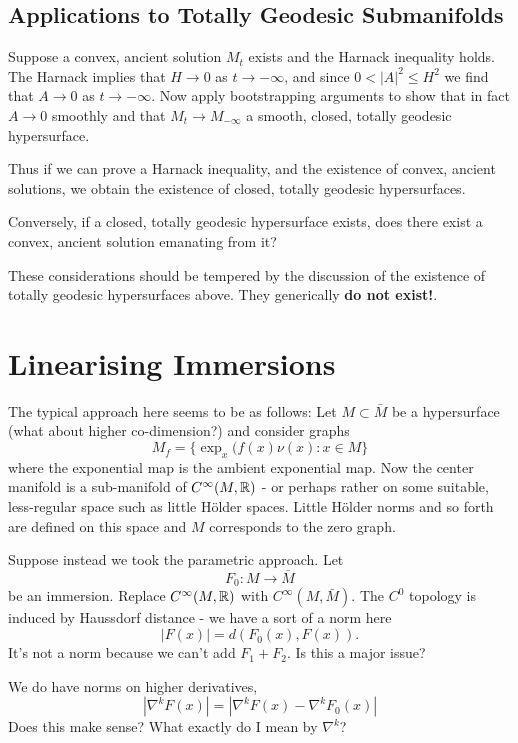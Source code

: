 \documentclass{amsart}
\begin{document}
\subsection{Applications to Totally Geodesic Submanifolds}
\label{subsec:applications_totally_geodesic}

Suppose a convex, ancient solution \(M_t\) exists and the Harnack inequality holds. The Harnack implies that \(H \to 0\) as \(t \to -\infty\), and since \(0 < |A|^2 \leq H^2\) we find that \(A \to 0\) as \(t \to -\infty\). Now apply bootstrapping arguments to show that in fact \(A \to 0\) smoothly and that \(M_t \to M_{-\infty}\) a smooth, closed, totally geodesic hypersurface.

Thus if we can prove a Harnack inequality, and the existence of convex, ancient solutions, we obtain the existence of closed, totally geodesic hypersurfaces.

Conversely, if a closed, totally geodesic hypersurface exists, does there exist a convex, ancient solution emanating from it?

These considerations should be tempered by the discussion of the existence of totally geodesic hypersurfaces above. They generically \textbf{do not exist!}.

\section{Linearising Immersions}
\label{sec:linearising_immersions}

The typical approach here seems to be as follows: Let \(M \subset \bar{M}\) be a hypersurface (what about higher co-dimension?) and consider graphs
\[
M_f = \{\exp_x(f(x)\nu(x) : x \in M\}
\]
where the exponential map is the ambient exponential map. Now the center manifold is a sub-manifold of \(C^{\infty}(M, \mathbb{R})\) - or perhaps rather on some suitable, less-regular space such as little H\"older spaces. Little H\"older norms and so forth are defined on this space and \(M\) corresponds to the zero graph.

Suppose instead we took the parametric approach. Let
\[
F_0 : M \to \bar{M}
\]
be an immersion. Replace \(C^{\infty}(M, \mathbb{R})\) with \(C^{\infty} (M, \bar{M})\). The \(C^0\) topology is induced by Haussdorf distance - we have a sort of a norm here
\[
|F(x)| = d(F_0(x), F(x)).
\]
It's not a norm because we can't add $F_1 + F_2$. Is this a major issue?

We do have norms on higher derivatives,
\[
|\nabla^k F (x)| = |\nabla^k F(x) - \nabla^k F_0(x)|
\]
Does this make sense? What exactly do I mean by \(\nabla^k\)? 
\end{document}
